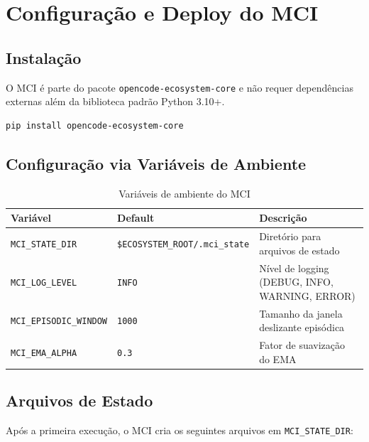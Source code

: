 \section{Configuração e Deploy do MCI}
\label{sec:deployment}

\subsection{Instalação}

O MCI é parte do pacote \texttt{opencode-ecosystem-core} e não requer dependências externas além da biblioteca padrão Python 3.10+.

\begin{verbatim}
pip install opencode-ecosystem-core
\end{verbatim}

\subsection{Configuração via Variáveis de Ambiente}

\begin{table}[htbp]
\centering
\caption{Variáveis de ambiente do MCI}
\label{tab:env-vars}
\begin{tabular}{@{}p{4cm}p{4cm}p{5.5cm}@{}}
\toprule
\textbf{Variável} & \textbf{Default} & \textbf{Descrição} \\
\midrule
\texttt{MCI\_STATE\_DIR} & \texttt{\$ECOSYSTEM\_ROOT/.mci\_state} & Diretório para arquivos de estado \\
\texttt{MCI\_LOG\_LEVEL} & \texttt{INFO} & Nível de logging (DEBUG, INFO, WARNING, ERROR) \\
\texttt{MCI\_EPISODIC\_WINDOW} & \texttt{1000} & Tamanho da janela deslizante episódica \\
\texttt{MCI\_EMA\_ALPHA} & \texttt{0.3} & Fator de suavização do EMA \\
\bottomrule
\end{tabular}
\end{table}

\subsection{Arquivos de Estado}

Após a primeira execução, o MCI cria os seguintes arquivos em \texttt{MCI\_STATE\_DIR}:

